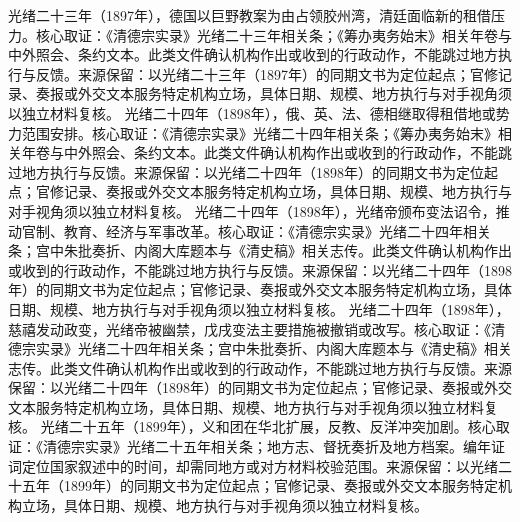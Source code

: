光绪二十三年（1897年），德国以巨野教案为由占领胶州湾，清廷面临新的租借压力。核心取证：《清德宗实录》光绪二十三年相关条；《筹办夷务始末》相关年卷与中外照会、条约文本。此类文件确认机构作出或收到的行政动作，不能跳过地方执行与反馈。来源保留：以光绪二十三年（1897年）的同期文书为定位起点；官修记录、奏报或外交文本服务特定机构立场，具体日期、规模、地方执行与对手视角须以独立材料复核。
光绪二十四年（1898年），俄、英、法、德相继取得租借地或势力范围安排。核心取证：《清德宗实录》光绪二十四年相关条；《筹办夷务始末》相关年卷与中外照会、条约文本。此类文件确认机构作出或收到的行政动作，不能跳过地方执行与反馈。来源保留：以光绪二十四年（1898年）的同期文书为定位起点；官修记录、奏报或外交文本服务特定机构立场，具体日期、规模、地方执行与对手视角须以独立材料复核。
光绪二十四年（1898年），光绪帝颁布变法诏令，推动官制、教育、经济与军事改革。核心取证：《清德宗实录》光绪二十四年相关条；宫中朱批奏折、内阁大库题本与《清史稿》相关志传。此类文件确认机构作出或收到的行政动作，不能跳过地方执行与反馈。来源保留：以光绪二十四年（1898年）的同期文书为定位起点；官修记录、奏报或外交文本服务特定机构立场，具体日期、规模、地方执行与对手视角须以独立材料复核。
光绪二十四年（1898年），慈禧发动政变，光绪帝被幽禁，戊戌变法主要措施被撤销或改写。核心取证：《清德宗实录》光绪二十四年相关条；宫中朱批奏折、内阁大库题本与《清史稿》相关志传。此类文件确认机构作出或收到的行政动作，不能跳过地方执行与反馈。来源保留：以光绪二十四年（1898年）的同期文书为定位起点；官修记录、奏报或外交文本服务特定机构立场，具体日期、规模、地方执行与对手视角须以独立材料复核。
光绪二十五年（1899年），义和团在华北扩展，反教、反洋冲突加剧。核心取证：《清德宗实录》光绪二十五年相关条；地方志、督抚奏折及地方档案。编年证词定位国家叙述中的时间，却需同地方或对方材料校验范围。来源保留：以光绪二十五年（1899年）的同期文书为定位起点；官修记录、奏报或外交文本服务特定机构立场，具体日期、规模、地方执行与对手视角须以独立材料复核。
